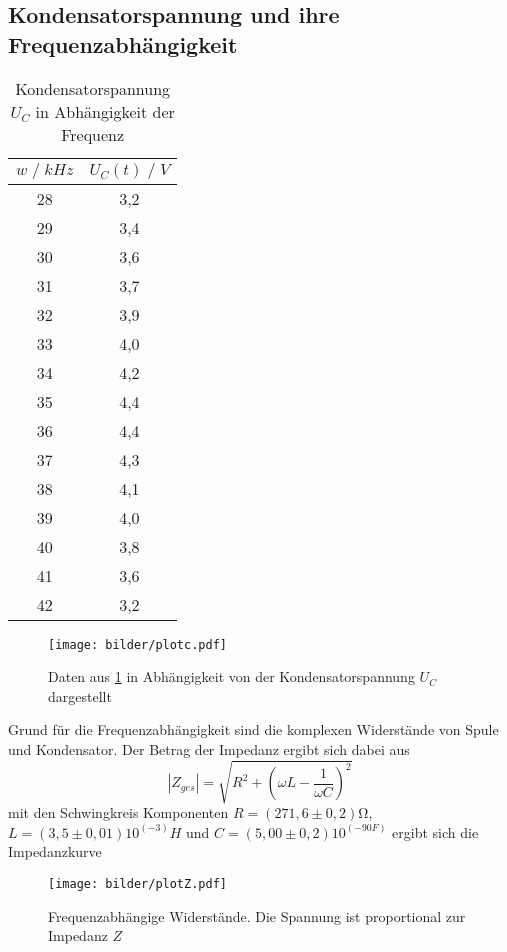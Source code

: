 \subsection{Kondensatorspannung und ihre Frequenzabhängigkeit}
\begin{table}
    \centering
    \begin{tabular}{c c}
        \toprule
        $w\;/\;kHz$ & $U_C(t)\;/\;V$\\
        \midrule
        28      &3,2\\
        29      &3,4\\
        30      &3,6\\
        31      &3,7\\
        32      &3,9\\
        33      &4,0\\
        34      &4,2\\
        35      &4,4\\
        36      &4,4\\
        37      &4,3\\
        38      &4,1\\
        39      &4,0\\
        40      &3,8\\
        41      &3,6\\
        42      &3,2\\
        \bottomrule
    \end{tabular}
    \caption{Kondensatorspannung $U_C$ in Abhängigkeit der Frequenz}
    \label{tab:tabelle_w}
\end{table}
\begin{figure}[H]
    \centering
    \texttt{[image: bilder/plotc.pdf]}
    \caption{
        Daten aus \ref{tab:tabelle_w} in Abhängigkeit von der Kondensatorspannung $U_C$ dargestellt
    }
\end{figure}
Grund für die Frequenzabhängigkeit sind die komplexen Widerstände von Spule und Kondensator.
Der Betrag der Impedanz ergibt sich dabei aus
\begin{equation}
    |Z_{ges}|=\sqrt{R^2+(\omega L-\frac{1}{\omega C})^2}
\end{equation}
mit den Schwingkreis Komponenten $R=(271,6\pm0,2)\si{\ohm}$, $L=(3,5\pm 0,01)10^(-3)H$ und $C=(5,00\pm 0,2)10^(-90F)$ ergibt 
sich die Impedanzkurve
\begin{figure}[H]
    \centering
    \texttt{[image: bilder/plotZ.pdf]}
    \caption{
        Frequenzabhängige Widerstände. Die Spannung ist proportional zur Impedanz $Z$
    }
    \label{fig:Frequenzabh_Wiederstand}
\end{figure}
\newpage





